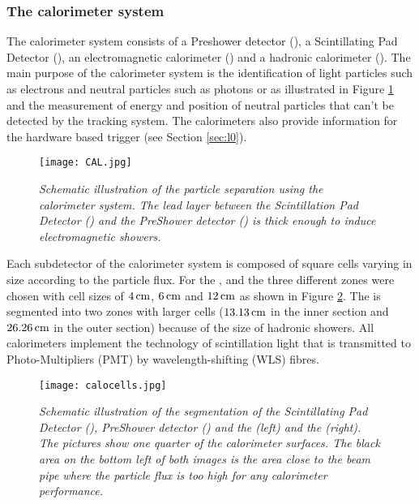 \subsubsection{The calorimeter system}
The \lhcb calorimeter system \cite{calo} consists of a Preshower detector (\presh), a Scintillating Pad Detector (\spd), an electromagnetic calorimeter (\ecal) and a hadronic calorimeter (\hcal). The main purpose of the calorimeter system is the identification of light particles such as electrons and neutral particles such as photons or \piz as illustrated in Figure \ref{fig:pid} \cite{pidcalo} and the measurement of energy and position of neutral particles that can't be detected by the tracking system. The calorimeters also provide information for the hardware based \lone trigger (see Section \ref{sec:l0}).
\begin{figure}[ht]
\vspace{-0.3cm}
  \begin{center}
    \texttt{[image: CAL.jpg]}
  \end{center}
  \vspace*{-1cm}
  \caption{\textit{Schematic illustration of the particle separation using the calorimeter system. The lead layer between the Scintillation Pad Detector (\spd) and the PreShower detector (\presh) is thick enough to induce electromagnetic showers.}\cite{calo}}
  \label{fig:pid}
  \vspace*{-0.5cm}
\end{figure}

Each subdetector of the calorimeter system is composed of square cells varying in size according to the particle flux. For the \spd, \presh and the \ecal three different zones were chosen with cell sizes of $4\rm \,cm$, $6\rm \,cm$ and $12\rm \,cm$ as shown in Figure \ref{fig:calo}. The \hcal is segmented into two zones with larger cells ($13.13\rm \,cm$ in the inner section and $26.26\rm \,cm$ in the outer section) because of the size of hadronic showers. All calorimeters implement the technology of scintillation light that is transmitted to Photo-Multipliers (PMT) by wavelength-shifting (WLS) fibres.\\
\begin{figure}[ht]
  \begin{center}
  	\vspace*{-0.8cm}
    \texttt{[image: calocells.jpg]}
  \vspace*{-0.5cm}
  \end{center}
  \caption{\textit{Schematic illustration of the segmentation of the Scintillating Pad Detector (\spd), PreShower detector (\presh) and the \ecal (left) and the \hcal (right). The pictures show one quarter of the calorimeter surfaces. The black area on the bottom left of both images is the area close to the beam pipe where the particle flux is too high for any calorimeter performance.}\cite{calo}}
  \label{fig:calo}
  \vspace*{-0.5cm}
\end{figure}

